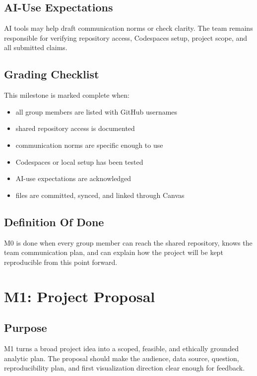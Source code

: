 \documentclass[
  letterpaper,
  DIV=11,
  numbers=noendperiod,
  oneside]{scrreprt}
\providecommand{\tightlist}{%
  \setlength{\itemsep}{0pt}\setlength{\parskip}{0pt}}
\begin{document}
\section{AI-Use Expectations}\label{ai-use-expectations-11}

AI tools may help draft communication norms or check clarity. The team
remains responsible for verifying repository access, Codespaces setup,
project scope, and all submitted claims.

\section{Grading Checklist}\label{grading-checklist-10}

This milestone is marked complete when:

\begin{itemize}
\tightlist
\item
  all group members are listed with GitHub usernames
\item
  shared repository access is documented
\item
  communication norms are specific enough to use
\item
  Codespaces or local setup has been tested
\item
  AI-use expectations are acknowledged
\item
  files are committed, synced, and linked through Canvas
\end{itemize}

\section{Definition Of Done}\label{definition-of-done-21}

M0 is done when every group member can reach the shared repository,
knows the team communication plan, and can explain how the project will
be kept reproducible from this point forward.

\chapter{M1: Project Proposal}\label{m1-project-proposal}

\section{Purpose}\label{purpose-14}

M1 turns a broad project idea into a scoped, feasible, and ethically
grounded analytic plan. The proposal should make the audience, data
source, question, reproducibility plan, and first visualization
direction clear enough for feedback.
\end{document}
